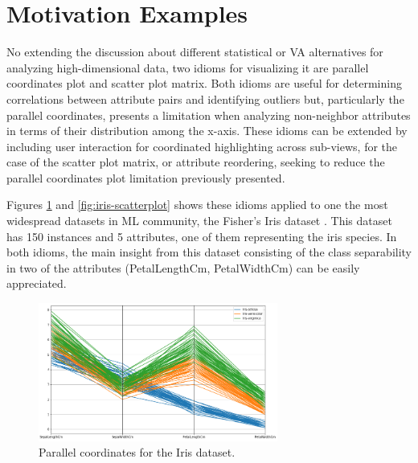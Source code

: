 \section{Motivation Examples}
\label{section1.1}

No extending the discussion about different statistical or VA alternatives for analyzing high-dimensional data, two idioms for visualizing it are parallel coordinates plot and scatter plot matrix. Both idioms are useful for determining correlations between attribute pairs and identifying outliers but, particularly the parallel coordinates, presents a limitation when analyzing non-neighbor attributes in terms of their distribution among the x-axis. These idioms can be extended by including user interaction for coordinated highlighting across sub-views, for the case of the scatter plot matrix, or attribute reordering, seeking to reduce the parallel coordinates plot limitation previously presented.

Figures \ref{fig:iris-parallel} and \ref{fig:iris-scatterplot} shows these idioms applied to one the most widespread datasets in ML community, the Fisher's Iris dataset \cite{FisherIris}. This dataset has 150 instances and 5 attributes, one of them representing the iris species. In both idioms, the main insight from this dataset consisting of the class separability in two of the attributes (PetalLengthCm, PetalWidthCm) can be easily appreciated.

\begin{figure}[ht]
 \centering
 \includegraphics[width=0.7\textwidth]{iris-parallel.png}
 \caption{Parallel coordinates for the Iris dataset.}
 \label{fig:iris-parallel}
\end{figure}


